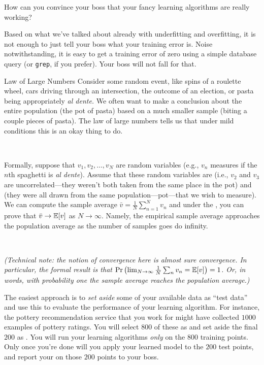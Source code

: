 How can you convince your boss that your fancy learning algorithms are
really working?

Based on what we've talked about already with underfitting and
overfitting, it is not enough to just tell your boss what your
training error is.  Noise notwithstanding, it is easy to get a
training error of zero using a simple database query (or {\tt grep},
if you prefer).  Your boss will not fall for that.

\begin{mathreview}{Law of Large Numbers}
  Consider some random event, like spins of a roulette wheel, cars
  driving through an intersection, the outcome of an election, or
  pasta being appropriately \emph{al dente.} We often want to make a
  conclusion about the entire population (the pot of pasta) based on a
  much smaller sample (biting a couple pieces of pasta). The law of
  large numbers tells us that under mild conditions this is an okay
  thing to do.

  ~

  Formally, suppose that $v_1, v_2, \dots, v_N$ are random variables
  (e.g., $v_n$ measures if the $n$th spaghetti is \emph{al
    dente}). Assume that these random variables are 
  (i.e., $v_2$ and $v_3$ are uncorrelated---they weren't both taken
  from the same place in the pot) and 
  (they were all drawn from the same population---pot---that we wish
  to measure). We can compute the sample average $\bar v = \frac 1 N
  \sum_{n=1}^N v_n$ and under the ,
  you can prove that $\bar v \rightarrow \mathbb{E}[v]$ as $N \rightarrow
  \infty$. Namely, the empirical sample average approaches the
  population average as the number of samples goes do infinity.

  ~

  \textit{(Technical note: the notion of convergence here is \emph{almost sure} convergence. In particular, the formal result is that $\textrm{Pr}\left(\lim_{N\rightarrow\infty} \frac 1 N \sum_n v_n = \mathbb{E}[v]\right) = 1$. Or, in words, with probability one the sample average reaches the population average.)}
\end{mathreview}

The easiest approach is to \emph{set aside} some of your available
data as ``test data'' and use this to evaluate the performance of your
learning algorithm.  For instance, the pottery recommendation service
that you work for might have collected $1000$ examples of pottery
ratings.  You will select $800$ of these as 
and set aside the final $200$ as .  You will run
your learning algorithms \emph{only} on the $800$ training points.
Only once you're done will you apply your learned model to the $200$
test points, and report your  on those $200$
points to your boss.

